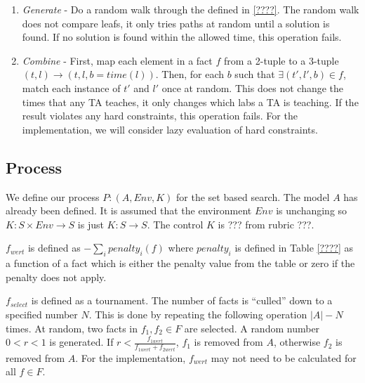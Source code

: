 \documentclass{article}
\begin{document}
\begin{enumerate}

\item \textit{Generate} - Do a random walk through the defined in
  \ref{????}. The random walk does not compare leafs, it only tries
  paths at random until a solution is found. If no solution is found
  within the allowed time, this operation fails.

\item \textit{Combine} - First, map each element in a fact $f$ from a
  2-tuple to a 3-tuple $(t, l) \to (t, l, b = time(l))$. Then, for
  each $b$ such that $\exists (t',l',b) \in f$, match each instance of
  $t'$ and $l'$ once at random. This does not change the times that
  any TA teaches, it only changes which labs a TA is teaching. If the
  result violates any hard constraints, this operation fails. For the
  implementation, we will consider lazy evaluation of hard
  constraints.
\end{enumerate}

\subsection{Process}

We define our process $P: (A, Env, K)$ for the set based search. The
model $A$ has already been defined. It is assumed that the environment
$Env$ is unchanging so $K: S \times Env \to S$ is just $K: S \to S$.
The control $K$ is ??? from rubric ???.

$f_{wert}$ is defined as $-\sum\limits_{i}^{} penalty_i(f)$ where $
penalty_i$ is defined in Table \ref{????} as a function of a fact
which is either the penalty value from the table or zero if the
penalty does not apply.

$f_{select}$ is defined as a tournament. The number of facts is
``culled'' down to a specified number $N$. This is done by repeating
the following operation $|A|-N$ times. At random, two facts in $f_1,
f_2 \in F$ are selected. A random number $0 < r < 1$ is generated. If
$r < \frac{f_{1wert}}{f_{1wert} + f_{2wert}}$, $f_1$ is removed from
$A$, otherwise $f_2$ is removed from $A$. For the implementation,
$f_{wert}$ may not need to be calculated for all $f \in F$.
\end{document}
